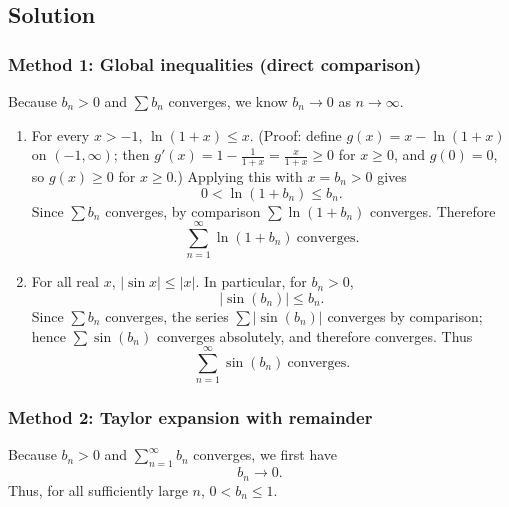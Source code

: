 \documentclass[12pt]{article}
\begin{document}
\subsection*{Solution}

\subsubsection*{Method 1: Global inequalities (direct comparison)}
Because \(b_n>0\) and \(\sum b_n\) converges, we know \(b_n\to 0\) as \(n\to\infty\).

\begin{enumerate}[label=(\roman*)]
\item For every \(x>-1\), \(\ln(1+x)\le x\). (Proof: define \(g(x)=x-\ln(1+x)\) on \((-1,\infty)\); then \(g'(x)=1-\frac{1}{1+x}=\frac{x}{1+x}\ge 0\) for \(x\ge 0\), and \(g(0)=0\), so \(g(x)\ge 0\) for \(x\ge 0\).)
Applying this with \(x=b_n>0\) gives
\[
0<\ln(1+b_n)\le b_n.
\]
Since \(\sum b_n\) converges, by comparison \(\sum \ln(1+b_n)\) converges. Therefore
\[
\boxed{\sum_{n=1}^{\infty}\ln(1+b_n)\ \text{converges}.}
\]

\item For all real \(x\), \(|\sin x|\le |x|\). In particular, for \(b_n>0\),
\[
|\sin(b_n)|\le b_n.
\]
Since \(\sum b_n\) converges, the series \(\sum |\sin(b_n)|\) converges by comparison; hence \(\sum \sin(b_n)\) converges absolutely, and therefore converges. Thus
\[
\boxed{\sum_{n=1}^{\infty}\sin(b_n)\ \text{converges}.}
\]
\end{enumerate}

\subsubsection*{Method 2: Taylor expansion with remainder}
Because \(b_n>0\) and \(\sum_{n=1}^{\infty}b_n\) converges, we first have
\[
b_n\to 0.
\]
Thus, for all sufficiently large \(n\), \(0<b_n\le 1\).
\end{document}

